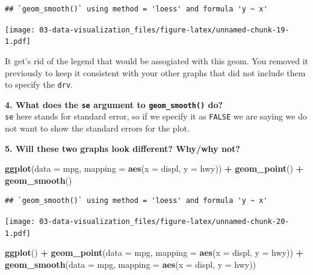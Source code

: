\documentclass[]{book}
\newenvironment{Shaded}{\begin{snugshade}}{\end{snugshade}}
\newcommand{\DataTypeTok}[1]{\textcolor[rgb]{0.13,0.29,0.53}{#1}}
\newcommand{\KeywordTok}[1]{\textcolor[rgb]{0.13,0.29,0.53}{\textbf{#1}}}
\newcommand{\NormalTok}[1]{#1}
\newcommand{\OperatorTok}[1]{\textcolor[rgb]{0.81,0.36,0.00}{\textbf{#1}}}
\newcommand{\StringTok}[1]{\textcolor[rgb]{0.31,0.60,0.02}{#1}}
\theoremstyle{definition}
\theoremstyle{definition}
\theoremstyle{definition}
\theoremstyle{remark}
\begin{document}
\begin{verbatim}
## `geom_smooth()` using method = 'loess' and formula 'y ~ x'
\end{verbatim}

\texttt{[image: 03-data-visualization\_files/figure-latex/unnamed-chunk-19-1.pdf]}

It get's rid of the legend that would be assogiated with this geom. You
removed it previously to keep it consistent with your other graphs that
did not include them to specify the \texttt{drv}.

\textbf{4. What does the \texttt{se} argument to \texttt{geom\_smooth()}
do?}\\
\texttt{se} here stands for standard error, so if we specify it as
\texttt{FALSE} we are saying we do not want to show the standard errors
for the plot.

\textbf{5. Will these two graphs look different? Why/why not?}

\begin{Shaded}
\begin{Highlighting}[]
\KeywordTok{ggplot}\NormalTok{(}\DataTypeTok{data =}\NormalTok{ mpg, }\DataTypeTok{mapping =} \KeywordTok{aes}\NormalTok{(}\DataTypeTok{x =}\NormalTok{ displ, }\DataTypeTok{y =}\NormalTok{ hwy)) }\OperatorTok{+}\StringTok{ }
\StringTok{  }\KeywordTok{geom_point}\NormalTok{() }\OperatorTok{+}\StringTok{ }
\StringTok{  }\KeywordTok{geom_smooth}\NormalTok{()}
\end{Highlighting}
\end{Shaded}

\begin{verbatim}
## `geom_smooth()` using method = 'loess' and formula 'y ~ x'
\end{verbatim}

\texttt{[image: 03-data-visualization\_files/figure-latex/unnamed-chunk-20-1.pdf]}

\begin{Shaded}
\begin{Highlighting}[]
\KeywordTok{ggplot}\NormalTok{() }\OperatorTok{+}\StringTok{ }
\StringTok{  }\KeywordTok{geom_point}\NormalTok{(}\DataTypeTok{data =}\NormalTok{ mpg, }\DataTypeTok{mapping =} \KeywordTok{aes}\NormalTok{(}\DataTypeTok{x =}\NormalTok{ displ, }\DataTypeTok{y =}\NormalTok{ hwy)) }\OperatorTok{+}\StringTok{ }
\StringTok{  }\KeywordTok{geom_smooth}\NormalTok{(}\DataTypeTok{data =}\NormalTok{ mpg, }\DataTypeTok{mapping =} \KeywordTok{aes}\NormalTok{(}\DataTypeTok{x =}\NormalTok{ displ, }\DataTypeTok{y =}\NormalTok{ hwy))}
\end{Highlighting}
\end{Shaded}
\end{document}
